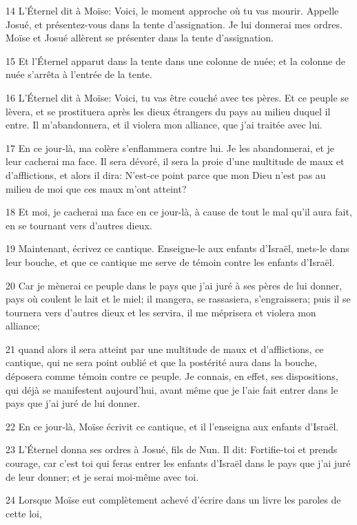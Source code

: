 \par 14 L'Éternel dit à Moïse: Voici, le moment approche où tu vas mourir. Appelle Josué, et présentez-vous dans la tente d'assignation. Je lui donnerai mes ordres. Moïse et Josué allèrent se présenter dans la tente d'assignation.
\par 15 Et l'Éternel apparut dans la tente dans une colonne de nuée; et la colonne de nuée s'arrêta à l'entrée de la tente.
\par 16 L'Éternel dit à Moïse: Voici, tu vas être couché avec tes pères. Et ce peuple se lèvera, et se prostituera après les dieux étrangers du pays au milieu duquel il entre. Il m'abandonnera, et il violera mon alliance, que j'ai traitée avec lui.
\par 17 En ce jour-là, ma colère s'enflammera contre lui. Je les abandonnerai, et je leur cacherai ma face. Il sera dévoré, il sera la proie d'une multitude de maux et d'afflictions, et alors il dira: N'est-ce point parce que mon Dieu n'est pas au milieu de moi que ces maux m'ont atteint?
\par 18 Et moi, je cacherai ma face en ce jour-là, à cause de tout le mal qu'il aura fait, en se tournant vers d'autres dieux.
\par 19 Maintenant, écrivez ce cantique. Enseigne-le aux enfants d'Israël, mets-le dans leur bouche, et que ce cantique me serve de témoin contre les enfants d'Israël.
\par 20 Car je mènerai ce peuple dans le pays que j'ai juré à ses pères de lui donner, pays où coulent le lait et le miel; il mangera, se rassasiera, s'engraissera; puis il se tournera vers d'autres dieux et les servira, il me méprisera et violera mon alliance;
\par 21 quand alors il sera atteint par une multitude de maux et d'afflictions, ce cantique, qui ne sera point oublié et que la postérité aura dans la bouche, déposera comme témoin contre ce peuple. Je connais, en effet, ses dispositions, qui déjà se manifestent aujourd'hui, avant même que je l'aie fait entrer dans le pays que j'ai juré de lui donner.
\par 22 En ce jour-là, Moïse écrivit ce cantique, et il l'enseigna aux enfants d'Israël.
\par 23 L'Éternel donna ses ordres à Josué, fils de Nun. Il dit: Fortifie-toi et prends courage, car c'est toi qui feras entrer les enfants d'Israël dans le pays que j'ai juré de leur donner; et je serai moi-même avec toi.
\par 24 Lorsque Moïse eut complètement achevé d'écrire dans un livre les paroles de cette loi,
